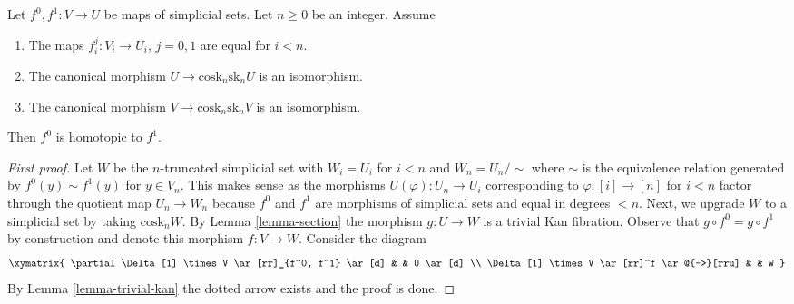 \begin{lemma}
\label{lemma-homotopy}
Let $f^0, f^1 : V \to U$ be maps of simplicial sets.
Let $n \geq 0$ be an integer.
Assume
\begin{enumerate}
\item The maps $f^j_i : V_i \to U_i$, $j = 0, 1$ are equal for $i < n$.
\item The canonical morphism $U \to \text{cosk}_n \text{sk}_n U$
is an isomorphism.
\item The canonical morphism $V \to \text{cosk}_n \text{sk}_n V$
is an isomorphism.
\end{enumerate}
Then $f^0$ is homotopic to $f^1$.
\end{lemma}

\begin{proof}[First proof]
Let $W$ be the $n$-truncated simplicial set with $W_i = U_i$ for
$i < n$ and $W_n = U_n / \sim$ where $\sim$ is the equivalence relation
generated by $f^0(y) \sim f^1(y)$ for $y \in V_n$. This makes sense
as the morphisms $U(\varphi) : U_n \to U_i$ corresponding to
$\varphi : [i] \to [n]$ for $i < n$ factor through the quotient map
$U_n \to W_n$ because $f^0$ and $f^1$ are morphisms of simplicial sets and
equal in degrees $< n$. Next, we upgrade $W$ to a simplicial set
by taking $\text{cosk}_n W$. By Lemma \ref{lemma-section}
the morphism $g : U \to W$ is a trivial Kan fibration. Observe
that $g \circ f^0 = g \circ f^1$ by construction and denote
this morphism $f : V \to W$. Consider the diagram
$$
\xymatrix{
\partial \Delta[1] \times V \ar[rr]_{f^0, f^1} \ar[d] & & U \ar[d] \\
\Delta[1] \times V \ar[rr]^f \ar@{-->}[rru] & & W
}
$$
By Lemma \ref{lemma-trivial-kan} the dotted arrow exists and the proof is done.
\end{proof}

